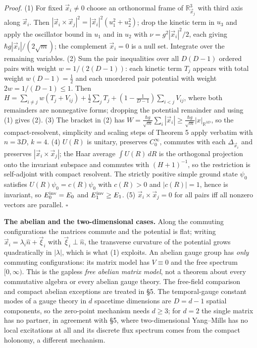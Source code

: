 \documentclass[11pt,a4paper]{article}
\begin{document}
\emph{Proof.} (1) For fixed \(\vec x_i\neq0\) choose an orthonormal
frame of \(\mathbb R^3_{\vec x_j}\) with third axis along \(\vec x_i\).
Then \(|\vec x_i\times\vec x_j|^2=|\vec x_i|^2(u_1^2+u_2^2)\); drop the
kinetic term in \(u_3\) and apply the oscillator bound in \(u_1\) and in
\(u_2\) with \(\nu=g^2|\vec x_i|^2/2\), each giving
\(\hbar g|\vec x_i|/(2\sqrt m)\); the complement \(\vec x_i=0\) is a
null set. Integrate over the remaining variables. (2) Sum the pair
inequalities over all \(D(D-1)\) ordered pairs with weight
\(w=1/(2(D-1))\): each kinetic term \(T_j\) appears with total weight
\(w(D-1)=\tfrac12\) and each unordered pair potential with weight
\(2w=1/(D-1)\le1\). Then
\(H=\sum_{i\ne j}w(T_j+V_{ij})+\tfrac12\sum_jT_j+(1-\tfrac1{D-1})\sum_{i<j}V_{ij}\),
where both remainders are nonnegative forms; dropping the potential
remainder and using (1) gives (2). (3) The bracket in (2) has
\(W=\frac{\hbar g}{\sqrt m}\sum_i|\vec x_i|\ge\frac{\hbar g}{\sqrt m}|x|_{\mathbb R^{3D}}\),
so the compact-resolvent, simplicity and scaling steps of Theorem 5
apply verbatim with \(n=3D\), \(k=4\). (4) \(U(R)\) is unitary,
preserves \(C_0^\infty\), commutes with each \(\Delta_{\vec x_i}\) and
preserves \(|\vec x_i\times\vec x_j|\); the Haar average
\(\int U(R)\,dR\) is the orthogonal projection onto the invariant
subspace and commutes with \((H+1)^{-1}\), so the restriction is
self-adjoint with compact resolvent. The strictly positive simple ground
state \(\psi_0\) satisfies \(U(R)\psi_0=c(R)\psi_0\) with \(c(R)>0\) and
\(|c(R)|=1\), hence is invariant, so \(E_0^{\rm inv}=E_0\) and
\(E_1^{\rm inv}\ge E_1\). (5) \(\vec x_i\times\vec x_j=0\) for all pairs
iff all nonzero vectors are parallel. \(\square\)

\textbf{The abelian and the two-dimensional cases.} Along the commuting
configurations the matrices commute and the potential is flat; writing
\(\vec x_i=\lambda_i\hat n+\vec\xi_i\) with \(\vec\xi_i\perp\hat n\),
the transverse curvature of the potential grows quadratically in
\(|\lambda|\), which is what (1) exploits. An abelian gauge group has
\emph{only} commuting configurations: its matrix model has \(V\equiv0\)
and the free spectrum \([0,\infty)\). This is the gapless \emph{free
abelian matrix model}, not a theorem about every commutative algebra or
every abelian gauge theory. The free-field comparison and compact
abelian exceptions are treated in §5. The temporal-gauge constant modes
of a gauge theory in \(d\) spacetime dimensions are \(D=d-1\) spatial
components, so the zero-point mechanism needs \(d\ge3\); for \(d=2\) the
single matrix has no partner, in agreement with §5, where
two-dimensional Yang--Mills has no local excitations at all and its
discrete flux spectrum comes from the compact holonomy, a different
mechanism.
\end{document}
